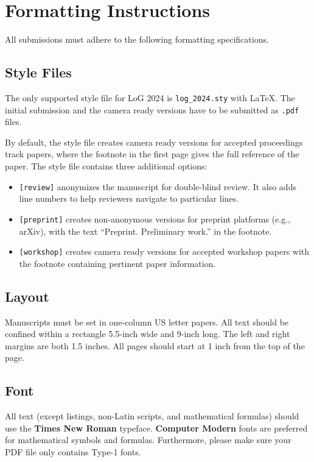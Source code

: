 \documentclass{article}
\begin{document}
\section{Formatting Instructions}

All submissions must adhere to the following formatting specifications.

\subsection{Style Files}

The only supported style file for LoG 2024 is \verb+log_2024.sty+ with \LaTeX.
The initial submission and the camera ready versions have to be submitted as \texttt{.pdf} files.

By default, the style file creates camera ready versions for accepted proceedings track papers, where the footnote in the first page gives the full reference of the paper.
The style file contains three additional options:
\begin{itemize}
	\item \verb+[review]+ anonymizes the manuscript for double-blind review. It also adds line numbers to help reviewers navigate to particular lines.
	\item \verb+[preprint]+ creates non-anonymous versions for preprint platforms (e.g., arXiv), with the text ``Preprint. Preliminary work.'' in the footnote.
	\item \verb+[workshop]+ creates camera ready versions for accepted workshop papers with the footnote containing pertinent paper information.
\end{itemize}

\subsection{Layout}
Manuscripts must be set in one-column US letter papers.
All text should be confined within a rectangle 5.5-inch wide and 9-inch long.
The left and right margins are both 1.5 inches.
All pages should start at 1 inch from the top of the page.

\subsection{Font}
All text (except listings, non-Latin scripts, and mathematical formulas) should use the \textbf{Times New Roman} typeface.
\textbf{Computer Modern} fonts are preferred for mathematical symbols and formulas.
Furthermore, please make sure your PDF file only contains Type-1 fonts.
\end{document}
